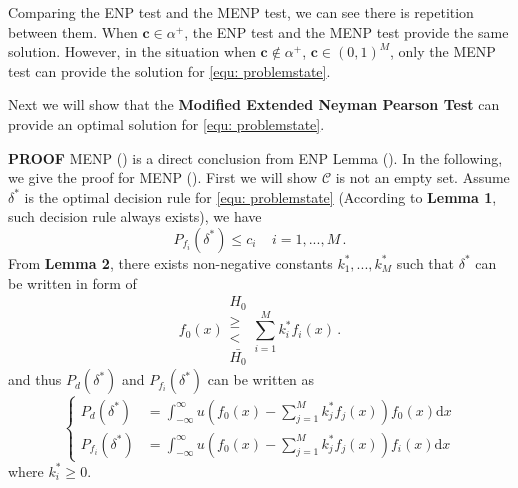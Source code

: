 Comparing the ENP test and the MENP test, we can see there is repetition between them. When $\mathbf{c} \in   \alpha^+$, the ENP test and the MENP test provide the same solution. However, in the situation when $\mathbf{c} \notin \alpha^+$, $\mathbf{c} \in (0, 1)^M$, only the MENP test can provide the solution for \eqref{equ: problemstate}. 

Next we will show that the \textbf{Modified Extended Neyman Pearson Test} can provide an optimal solution for \eqref{equ: problemstate}.

\textbf{PROOF}
MENP () is a direct conclusion from ENP Lemma (). In the following,  we give the proof for MENP (). First we will show $\mathcal{C}$ is not an empty set. 
Assume $\delta^\ast$ is the optimal decision rule for \eqref{equ: problemstate} (According to \textbf{Lemma 1}, such decision rule always exists), we have  
\begin{equation}
\label{condition 1}
P_{f_i}(\delta^\ast) \leq c_i\;\;\;\;i=1,  ..., M\,.
\end{equation}
From \textbf{Lemma 2}, there exists non-negative constants $k_1^\ast, ..., k_M^\ast$ such that $\delta^\ast$ can be written in form of 
\begin{equation}
f_0(x) \substack{H_0 \\ \geq \\ < \\ \bar{H_0}} \sum_{i=1}^{M}k_i^\ast f_i(x)\,.
\label{2015feb20a1}
\end{equation}
and thus $P_d(\delta^\ast)$ and $P_{f_i}(\delta^\ast)$ can be written as
\begin{equation}
\begin{cases}
\label{TEMP10}
P_{d}(\delta^\ast) &= \int_{-\infty}^{\infty} u(f_0(x) - \sum_{j=1}^{M}k_j^\ast f_j(x)) f_0(x) \mathrm{d}x\\
P_{f_i}(\delta^\ast) &= \int_{-\infty}^{\infty} u(f_0(x) - \sum_{j=1}^{M}k_j^\ast f_j(x)) f_i(x) \mathrm{d}x
\end{cases}
\end{equation}
where $k_i^\ast \geq 0$.

